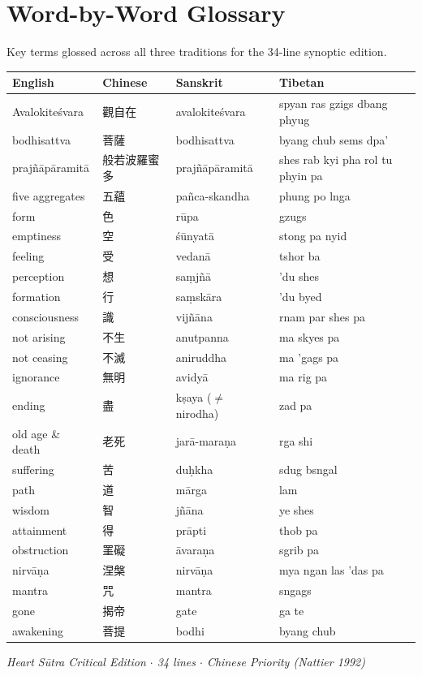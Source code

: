 \documentclass[9pt,a4paper]{article}
\begin{document}
\newpage


\section*{Word-by-Word Glossary}

Key terms glossed across all three traditions for the 34-line synoptic edition.

\footnotesize

\begin{longtable}{p{2.5cm} p{2.5cm} p{2.8cm} p{3.2cm}}
\textbf{English} & \textbf{Chinese} & \textbf{Sanskrit} & \textbf{Tibetan} \\
\hline
\endhead
Avalokiteśvara & 觀自在 & avalokiteśvara & spyan ras gzigs dbang phyug \\
bodhisattva & 菩薩 & bodhisattva & byang chub sems dpa' \\
prajñāpāramitā & 般若波羅蜜多 & prajñāpāramitā & shes rab kyi pha rol tu phyin pa \\
five aggregates & 五蘊 & pañca-skandha & phung po lnga \\
form & 色 & rūpa & gzugs \\
emptiness & 空 & śūnyatā & stong pa nyid \\
feeling & 受 & vedanā & tshor ba \\
perception & 想 & saṃjñā & 'du shes \\
formation & 行 & saṃskāra & 'du byed \\
consciousness & 識 & vijñāna & rnam par shes pa \\
not arising & 不生 & anutpanna & ma skyes pa \\
not ceasing & 不滅 & aniruddha & ma 'gags pa \\
ignorance & 無明 & avidyā & ma rig pa \\
ending & 盡 & kṣaya ($\neq$ nirodha) & zad pa \\
old age \& death & 老死 & jarā-maraṇa & rga shi \\
suffering & 苦 & duḥkha & sdug bsngal \\
path & 道 & mārga & lam \\
wisdom & 智 & jñāna & ye shes \\
attainment & 得 & prāpti & thob pa \\
obstruction & 罣礙 & āvaraṇa & sgrib pa \\
nirvāṇa & 涅槃 & nirvāṇa & mya ngan las 'das pa \\
mantra & 咒 & mantra & sngags \\
gone & 揭帝 & gate & ga te \\
awakening & 菩提 & bodhi & byang chub \\
\end{longtable}

\normalsize

\vspace{1em}
\begin{center}
{\small\itshape Heart Sūtra Critical Edition $\cdot$ 34 lines $\cdot$ Chinese Priority (Nattier 1992)}
\end{center}
\end{document}
